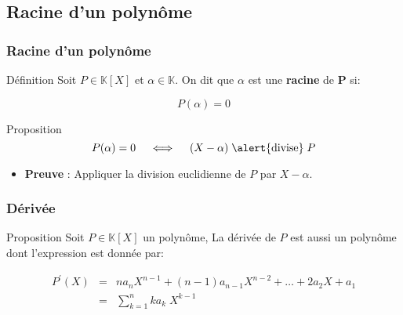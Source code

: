 \documentclass{beamer}
\newcommand{\setK}{\mathbb{K}}
\begin{document}
\subsection{Racine d'un polynôme}
\begin{frame}[t]
  \frametitle{Racine d'un polynôme}
  \begin{block}{Définition}
  Soit $P\in \setK[X]$ et \alert{$\alpha \in \setK$}. On dit que $\alpha$ est
  une \textbf{\alert{racine}}  de $\mathbf{P}$ si:

  \begin{equation}
    \label{eq:poly_root}
    P(\alpha ) = 0
  \end{equation}
\end{block}
\pause

\begin{block}{Proposition}
  \begin{equation}
    P(\alpha) = 0 \quad \iff \quad (X - \alpha)\;\text{\alert{divise}}\; P
  \end{equation}
\end{block}
\pause

\begin{itemize}
  \small
  \item \textbf{Preuve} : Appliquer la division euclidienne de $P$ par $X -
    \alpha$.
\end{itemize}
\end{frame}
\begin{frame}[t]
  \frametitle{Dérivée}
  
  \begin{block}{Proposition}
    Soit $P\in \setK[X]$ un polynôme, La dérivée de $P$ est aussi un polynôme
    dont l'expression est donnée par:

    \begin{eqnarray*}
      P^{'}(X) &=& na_{n} X^{n-1} + (n-1)a_{n-1}X^{n-2}+\ldots + 2a_2X + a_1\\
               & = & \sum_{k=1}^{n} ka_k\;X^{k-1}
    \end{eqnarray*}

  \end{block}
\end{frame}
\end{document}
